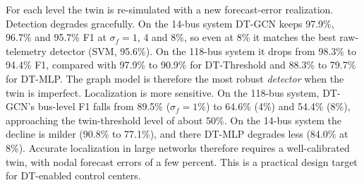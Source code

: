 For each level the twin is re-simulated with a new forecast-error realization. Detection degrades gracefully. On the 14-bus system DT-GCN keeps 97.9\%, 96.7\% and 95.7\% F1 at $\sigma_f=1$, 4 and 8\%, so even at 8\% it matches the best raw-telemetry detector (SVM, 95.6\%). On the 118-bus system it drops from 98.3\% to 94.4\% F1, compared with 97.9\% to 90.9\% for DT-Threshold and 88.3\% to 79.7\% for DT-MLP. The graph model is therefore the most robust \emph{detector} when the twin is imperfect. Localization is more sensitive. On the 118-bus system, DT-GCN's bus-level F1 falls from 89.5\% ($\sigma_f=1\%$) to 64.6\% (4\%) and 54.4\% (8\%), approaching the twin-threshold level of about 50\%. On the 14-bus system the decline is milder (90.8\% to 77.1\%), and there DT-MLP degrades less (84.0\% at 8\%). Accurate localization in large networks therefore requires a well-calibrated twin, with nodal forecast errors of a few percent. This is a practical design target for DT-enabled control centers.
